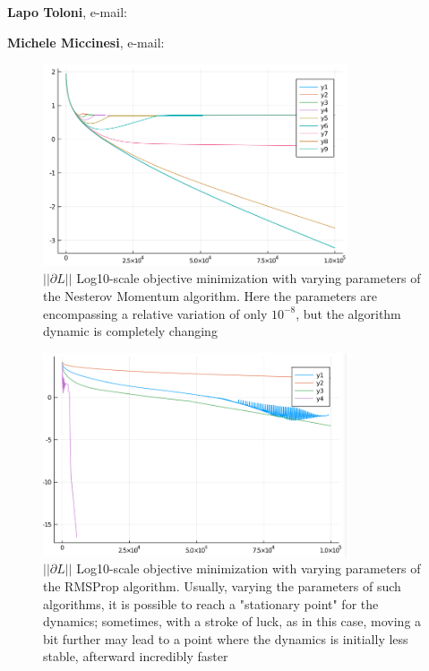 \documentclass[10pt,twoside,book,a5paper]{ncc}
\begin{document}
\begin{minipage}{\textwidth} 


\small
\noindent \textbf{Lapo Toloni}, e-mail: 

\noindent \textbf{Michele Miccinesi}, e-mail: \par 
\end{minipage}
\newpage
\begin{figure}[ht]
\centering
\includegraphics[width=0.80\textwidth]{NesterovParameters}
\caption{$||\partial L||$ Log10-scale objective minimization with varying parameters of the Nesterov Momentum algorithm. Here the parameters are encompassing a relative variation of only $10^{-8}$, but the algorithm dynamic is completely changing}
\label{fig:NesterovParameters}
\end{figure}
\begin{figure}[ht]
\centering
\includegraphics[width=0.80\textwidth]{RMSPropParameters}
\caption{$||\partial L||$ Log10-scale objective minimization with varying parameters of the RMSProp algorithm. Usually, varying the parameters of such algorithms, it is possible to reach a "stationary point" for the dynamics; sometimes, with a stroke of luck, as in this case, moving a bit further may lead to a point where the dynamics is initially less stable, afterward incredibly faster}
\label{fig:RMSPropParameters}
\end{figure}
\end{document}
